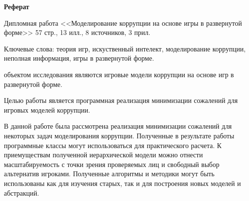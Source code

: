 \begin{center}
	{\large \textbf{Реферат}}
\end{center}
\par
Дипломная работа <<Моделирование коррупции на основе игры в развернутой форме>> 57 стр., 13 илл., 8 источников, 3 прил.
\par
Ключевые слова: теория игр, искуственный интелект, моделирование коррупции, неполная информация, игры в развернутой форме.
\par
объектом исследования являются игровые модели коррупции на основе игр в развернутой форме.
\par
Целью работы является программная реализация минимизации сожалений для игровых моделей коррупции.
\par 
В данной работе была рассмотрена реализация минимизации сожалений для некоторых задач моделирования коррупции.
Полученные в результате работы программные классы могут использоваться для практического расчета. К приемуществам полученной иерархической модели можно отнести масштабируемость с точки зрения проверяемых лиц и свободный выбор альтернатив игроками. Полученные алгоритмы и методики могут быть использованы как для изучения старых, так и для построения новых моделей и абстракций.